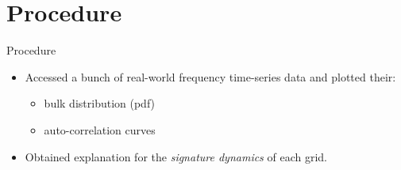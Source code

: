 \section[Procedure]{Procedure}
\label{sec:procedure}

\begin{frame}{Procedure}
	\begin{itemize}
		\item Accessed a bunch of real-world frequency time-series data and plotted their:
			\begin{itemize}
				\item bulk distribution (pdf) 
				\item auto-correlation curves
			\end{itemize}
		\item Obtained explanation for the \textit{signature dynamics}	of each grid.		
	\end{itemize}
\end{frame}
